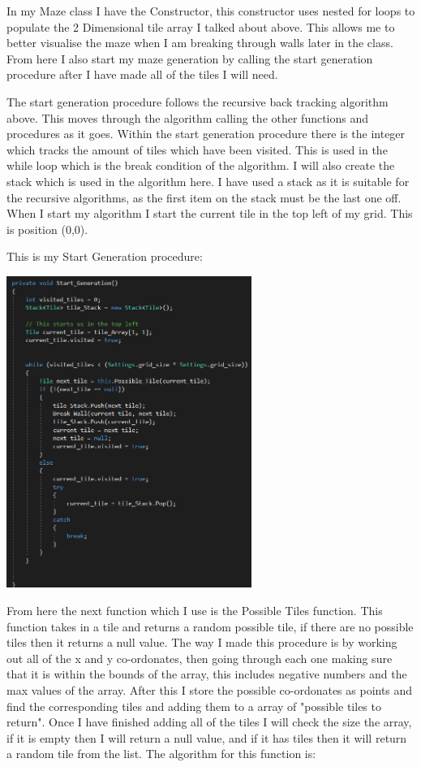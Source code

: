 \documentclass[12pt]{article}
\begin{document}
In my Maze class I have the Constructor, this constructor uses nested for loops to populate the 2 Dimensional tile array I talked about above. This allows me to better visualise the maze when I am breaking through walls later in the class. From here I also start my maze generation by calling the start generation procedure after I have made all of the tiles I will need.

The start generation procedure follows the recursive back tracking algorithm above. This moves through the algorithm calling the other functions and procedures as it goes. Within the start generation procedure there is the integer which tracks the amount of tiles which have been visited. This is used in the while loop which is the break condition of the algorithm. I will also create the stack which is used in the algorithm here. I have used a stack as it is suitable for the recursive algorithms, as the first item on the stack must be the last one off. When I start my algorithm I start the current tile in the top left of my grid. This is position (0,0).


This is my Start Generation procedure:

\includegraphics[width = 0.6\textwidth]{Maze_start_generation_procedure}

From here the next function which I use is the Possible Tiles function. This function takes in a tile and returns a random possible tile, if there are no possible tiles then it returns a null value. The way I made this procedure is by working out all of the x and y co-ordonates, then going through each one making sure that it is within the bounds of the array, this includes negative numbers and the max values of the array. After this I store the possible co-ordonates as points and find the corresponding tiles and adding them to a array of "possible tiles to return". Once I have finished adding all of the tiles I will check the size the array, if it is empty then I will return a null value, and if it has tiles then it will return a random tile from the list. The algorithm for this function is:
\end{document}
